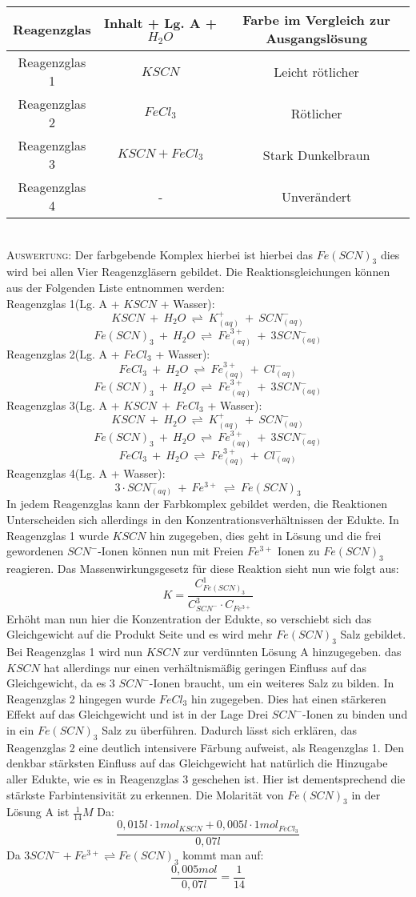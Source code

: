 \documentclass[12pt, a4paper]{article}
\begin{document}
\begin{tabular}{ccc}
Reagenzglas & Inhalt + Lg. A + $H_2O$ & Farbe im Vergleich zur Ausgangslösung \\
\hline
Reagenzglas 1 & $KSCN$ & Leicht rötlicher\\
Reagenzglas 2 & $FeCl_3$ & 	Rötlicher\\
Reagenzglas 3 & $KSCN + FeCl_3$ & Stark Dunkelbraun\\
Reagenzglas 4 & - & Unverändert\\
\end{tabular}\\

\textsc{Auswertung:}\hspace{8mm} Der farbgebende Komplex hierbei ist hierbei das $Fe(SCN)_3$ dies wird bei allen Vier Reagenzgläsern gebildet. Die Reaktionsgleichungen können aus der Folgenden Liste entnommen werden: \\
Reagenzglas 1(Lg. A + $KSCN$ + Wasser):$$KSCN\ +\ H_2O\ \rightleftharpoons\ K^+_{(aq)}\ +\ SCN^-_{(aq)} $$ $$Fe(SCN)_3\ +\ H_2O\ \rightleftharpoons\ Fe^{3+}_{(aq)}\ +\ 3SCN^-_{(aq)} $$
Reagenzglas 2(Lg. A + $FeCl_3$ + Wasser):$$FeCl_3\ +\ H_2O\ \rightleftharpoons\ Fe^{3+}_{(aq)}\ +\ Cl^-_{(aq)}$$ $$Fe(SCN)_3\ +\ H_2O\ \rightleftharpoons\ Fe^{3+}_{(aq)}\ +\ 3SCN^-_{(aq)}$$ 
Reagenzglas 3(Lg. A + $KSCN\ +\ FeCl_3$ + Wasser):$$KSCN\ +\ H_2O\ \rightleftharpoons\ K^+_{(aq)}\ +\ SCN^-_{(aq)}$$ $$Fe(SCN)_3\ +\ H_2O\ \rightleftharpoons\ Fe^{3+}_{(aq)}\ +\ 3SCN^-_{(aq)}$$ $$FeCl_3\ +\ H_2O\ \rightleftharpoons\ Fe^{3+}_{(aq)}\ +\ Cl^-_{(aq)}$$
Reagenzglas 4(Lg. A + Wasser):$$3\cdot SCN^-_{(aq)}\ +\ Fe^{3+}\ \rightleftharpoons\ Fe(SCN)_3$$ In jedem Reagenzglas kann der Farbkomplex gebildet werden, die Reaktionen Unterscheiden sich allerdings in den Konzentrationsverhältnissen der Edukte. In Reagenzglas 1 wurde $KSCN$ hin zugegeben, dies geht in Lösung und die frei gewordenen $SCN^-$-Ionen können nun mit Freien $Fe^{3+}$ Ionen zu $Fe(SCN)_3$ reagieren. Das Massenwirkungsgesetz für diese Reaktion sieht nun wie folgt aus: $$K = \displaystyle{\frac{C_{Fe(SCN)_3}^1}{C_{SCN^-}^3 \cdot C_{Fe^{3+}}}}$$ Erhöht man nun hier die Konzentration der Edukte, so verschiebt sich das Gleichgewicht auf die Produkt Seite und es wird mehr $Fe(SCN)_3$ Salz gebildet. Bei Reagenzglas 1 wird nun $KSCN$ zur verdünnten Lösung A hinzugegeben. das $KSCN$ hat allerdings nur einen verhältnismäßig geringen Einfluss auf das Gleichgewicht, da es 3 $SCN^-$-Ionen braucht, um ein weiteres Salz zu bilden. In Reagenzglas 2 hingegen wurde $FeCl_3$ hin zugegeben. Dies hat einen stärkeren Effekt auf das Gleichgewicht und ist in der Lage Drei $SCN^-$-Ionen zu binden und in ein $Fe(SCN)_3$ Salz zu überführen. Dadurch lässt sich erklären, das Reagenzglas 2 eine deutlich intensivere Färbung aufweist, als Reagenzglas 1. Den denkbar stärksten Einfluss auf das Gleichgewicht hat natürlich die Hinzugabe aller Edukte, wie es in Reagenzglas 3 geschehen ist. Hier ist dementsprechend die stärkste Farbintensivität zu erkennen. Die Molarität von $Fe(SCN)_3$ in der Lösung A ist $\frac{1}{14}M$ Da: $$\frac{0,015l \cdot 1mol_{KSCN} + 0,005l \cdot 1mol_{FeCl_3}}{0,07l}$$ Da $3SCN^- + Fe^{3+} \rightleftharpoons Fe(SCN)_3$ kommt man auf: $$\frac{0,005mol}{0,07l}=\frac{1}{14}$$
\end{document}
